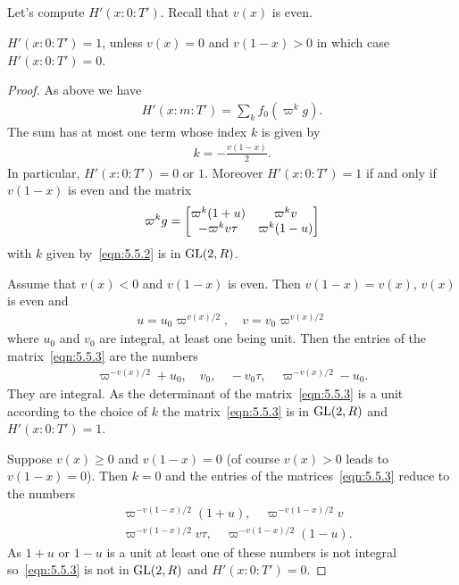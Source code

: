 \subsection{}
Let's compute $H'(x:0:T')$.
Recall that $v(x)$ is even.
\begin{proposition}\label{prop:5.5}
$H'(x:0:T')=1$, unless $v(x)=0$ and $v(1-x)>0$ in which case $H'(x:0:T')=0$.
\end{proposition}
\begin{proof}
As above we have
\begin{align}
    H'(x:m:T') = \sum_{k} f_{0}(\varpi^k g).
\end{align}
The sum has at most one term whose index $k$ is given by
\begin{align}
\label{eqn:5.5.2}
    k = - \frac{v(1-x)}{2}.
\end{align}
In particular, $H'(x:0:T')=0$ or $1$.
Moreover $H'(x:0:T')=1$ if and only if $v(1-x)$ is even and the matrix
\begin{align}
\label{eqn:5.5.3}
    \varpi^k g = \begin{bmatrix} \varpi^k(1+u) & \varpi^k v \\ -\varpi^k v\tau & \varpi^k(1-u) \end{bmatrix}
\end{align}
with $k$ given by~\eqref{eqn:5.5.2} is in $\mathrm{GL}(2, R)$.

Assume that $v(x) < 0$ and $v(1-x)$ is even.
Then $v(1-x) = v(x)$, $v(x)$ is even and
\begin{align*}
    u = u_0 \varpi^{v(x)/2}, \quad v = v_0 \varpi^{v(x) / 2}
\end{align*}
where $u_0$ and $v_0$ are integral, at least one being unit.
Then the entries of the matrix~\eqref{eqn:5.5.3} are the numbers
\begin{align*}
    \varpi^{-v(x) / 2} + u_0, \quad v_0, \quad -v_0 \tau, \quad \varpi^{-v(x) / 2} - u_0.
\end{align*}
They are integral.
As the determinant of the matrix~\eqref{eqn:5.5.3} is a unit according to the choice of $k$ the matrix~\eqref{eqn:5.5.3} is in $\mathrm{GL}(2, R)$ and $H'(x:0:T')=1$.

Suppose $v(x) \geq 0$ and $v(1-x)=0$ (of course $v(x) > 0$ leads to $v(1-x)=0$).
Then $k=0$ and the entries of the matrices~\eqref{eqn:5.5.3} reduce to the numbers
\begin{align*}
    & \varpi^{-v(1-x) / 2} (1+u), \quad \varpi^{-v(1-x)/2}v \\
    & \varpi^{-v(1-x)/2}v\tau, \quad \varpi^{-v(1-x)/2}(1-u).
\end{align*}
As $1+u$ or $1-u$ is a unit at least one of these numbers is not integral so~\eqref{eqn:5.5.3} is not in $\mathrm{GL}(2,R) $ and $H'(x:0:T')=0$.
\end{proof}

